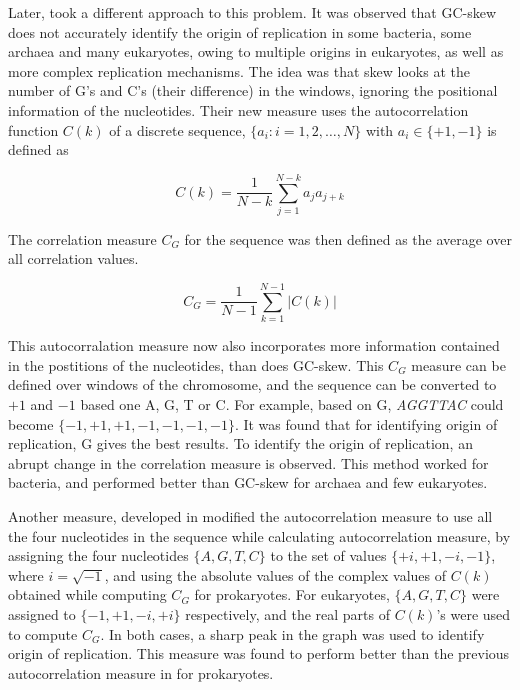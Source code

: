 \documentclass[10pt]{article}
\begin{document}
Later, \cite{autocorr} took a different approach to this problem. It was observed that GC-skew does not accurately identify the origin of replication in some bacteria, some archaea and many eukaryotes, owing to multiple origins in eukaryotes, as well as more complex replication mechanisms. The idea was that skew looks at the number of G's and C's (their difference) in the windows, ignoring the positional information of the nucleotides. Their new measure uses the autocorrelation function $C(k)$ of a discrete sequence, $\{a_i:i=1,2,\hdots,N\}$ with $a_i \in \{+1, -1\}$ is defined as

\begin{equation}
C(k) = \frac{1}{N-k}\sum_{j=1}^{N-k}a_j a_{j+k}
\end{equation}

The correlation measure $C_G$ for the sequence was then defined as the average over all correlation values.

\begin{equation}
C_G = \frac{1}{N-1}\sum_{k=1}^{N-1}|C(k)|
\end{equation}

This autocorralation measure now also incorporates more information contained in the postitions of the nucleotides, than does GC-skew.  This $C_G$ measure can be defined over windows of the chromosome, and the sequence can be converted to $+1$ and $-1$ based one A, G, T or C. For example, based on G, \textit{AGGTTAC} could become $\{-1, +1, +1, -1, -1, -1, -1\}$. It was found that for identifying origin of replication, G gives the best results. To identify the origin of replication, an abrupt change in the correlation measure is observed. This method worked for bacteria, and performed better than GC-skew for archaea and few eukaryotes.

Another measure, developed in \cite{icorr} modified the autocorrelation measure to use all the four nucleotides in the sequence while calculating autocorrelation measure, by assigning the four nucleotides $\{A, G, T, C\}$ to the set of values $\{+i, +1, -i, -1\}$, where $i = \sqrt{-1}$, and using the absolute values of the complex values of $C(k)$ obtained while computing $C_G$ for prokaryotes. For eukaryotes, $\{A, G, T, C\}$ were assigned to $\{-1, +1, -i, +i\}$ respectively, and the real parts of $C(k)$'s were used to compute $C_G$. In both cases, a sharp peak in the graph was used to identify origin of replication. This measure was found to perform better than the previous autocorrelation measure in \cite{autocorr} for prokaryotes.
\end{document}
